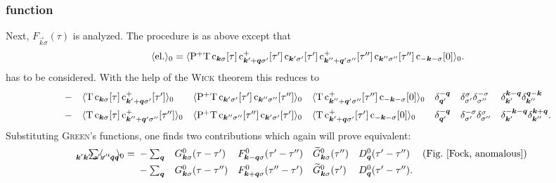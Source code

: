 \subsubsection{ function}

Next, $F_{\vec k \sigma}(\tau)$ is analyzed. The procedure is as above except
that
%
\begin{align*}
    \av{\text{el.}}_0= \av{\op P^+ \op T \,
        \op c_{\vec k \sigma}[\tau] \,
        \op c_{\vec k' + \vec q \sigma'}^+[\tau'] \,
        \op c_{\vec k' \sigma'}[\tau'] \,
        \op c_{\vec k'' + \vec q' \sigma''}^+[\tau''] \,
        \op c_{\vec k'' \sigma''}[\tau''] \,
        \op c_{-\vec k -\sigma}[0]}_0.
\end{align*}
%
has to be considered. With the help of the \textsc{Wick} theorem this reduces to
%
\begingroup
    \def\minalignsep{0pt}
    \begin{align*}
        &-
        && \av{\op T \, \op c_{\vec k \sigma}[\tau]
        \, \op c_{\vec k' + \vec q \sigma'}^+[\tau']}_0
        && \av{\op P^+ \op T \, \op c_{\vec k' \sigma'}[\tau']
        \, \op c_{\vec k'' \sigma''}[\tau'']}_0
        && \av{\op T \, \op c_{\vec k'' + \vec q' \sigma''}^+[\tau'']
        \, \op c_{-\vec k -\sigma}[0]}_0
        && \delta_{\vec q'}^{-\vec q}
        && \delta_{\sigma'}^\sigma \delta_{\sigma''}^{-\sigma}
        && \delta_{\vec k'}^{\vec k - \vec q}
           \delta_{\vec k''}^{\vec q - \vec k} \\
        &-
        && \av{\op T \, \op c_{\vec k \sigma}[\tau]
        \, \op c_{\vec k'' + \vec q' \sigma''}^+[\tau'']}_0
        && \av{\op P^+ \op T \, \op c_{\vec k'' \sigma''}[\tau'']
        \, \op c_{\vec k' \sigma'}[\tau']}_0
        && \av{\op T \, \op c_{\vec k' + \vec q \sigma'}^+[\tau']
        \, \op c_{-\vec k -\sigma}[0]}_0
        && \delta_{\vec q'}^{-\vec q}
        && \delta_{\sigma'}^{-\sigma} \delta_{\sigma''}^\sigma
        && \delta_{\vec k'}^{-\vec k - \vec q}
           \delta_{\vec k''}^{\vec k + \vec q}.
    \end{align*}
\endgroup
%
Substituting \textsc{Green}'s functions, one finds two contributions which again
will prove equivalent:
%
\begin{align*}
    \sum_{\mathclap{\vec k' \vec k'' \sigma' \sigma'' \vec q \vec q'}}
    \av \dots_0 =
    \let\displaystyle\textstyle
    \begin{aligned}[t]
        &- \sum_{\vec q}
        && G^0_{\vec k \sigma}(\tau - \tau')
        && F^0_{\vec k - \vec q \sigma}(\tau' - \tau'')
        && \smash{\widetilde G^0_{\vec k \sigma}}(\tau'')
        && D^0_{\vec q}(\tau' - \tau'')
        &  \text{(Fig.~\ref{Fock, anomalous})} \\
        &- \sum_{\vec q}
        && G^0_{\vec k \sigma}(\tau - \tau'')
        && F^0_{\vec k + \vec q \sigma}(\tau'' - \tau')
        && \smash{\widetilde G^0_{\vec k \sigma}}(\tau')
        && D^0_{\vec q}(\tau' - \tau'').
        &
    \end{aligned}
\end{align*}
